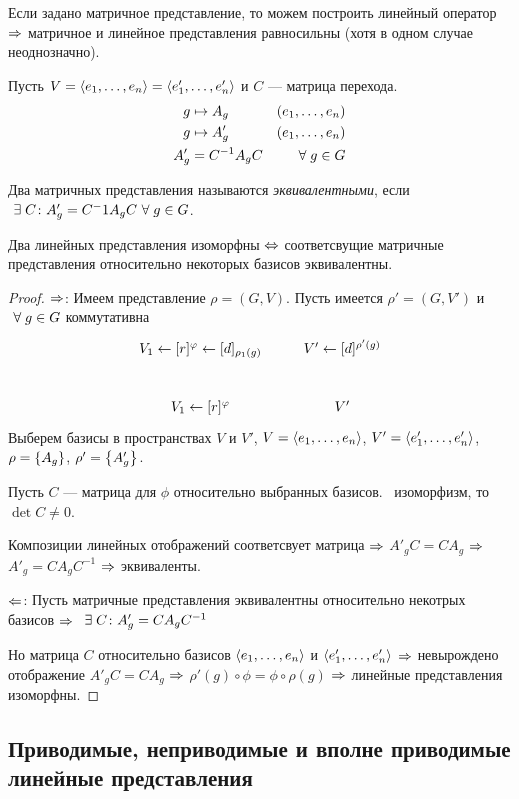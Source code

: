 Если задано матричное представление,
то можем построить линейный оператор $\Rightarrow$
матричное и линейное представления равносильны
(хотя в одном случае неоднозначно).

Пусть $V = \left\langle e_1 ,\ldots, e_n\right\rangle = \left\langle e'_1 ,\ldots, e'_n\right\rangle$ и $C$ --- матрица перехода.
\begin{align*}
	g &\mapsto A_g & \left(e_1 ,\ldots, e_n\right) \\
	g &\mapsto A'_g & \left(e_1 ,\ldots, e_n\right) \\
	A'_g & = C^{-1} A_g C & ~\forall\; g \in G
\end{align*}

\begin{df}
	Два матричных представления называются \textit{эквивалентными},
	если 
		$~\exists\; C \colon A'_g = C^-1 A_g C ~\forall\; g \in G$.
\end{df}

\begin{stm}
	Два линейных представления изоморфны $\Leftrightarrow$
	соответсвущие матричные представления относительно некоторых базисов эквивалентны.
\end{stm}
\begin{proof}
	$\Rightarrow$: Имеем представление $\rho = (G, V)$.
	Пусть имеется $\rho' = (G, V')$ и $~\forall\; g \in G$ коммутативна
	$$
		\xymatrix{
				V_1 \ar[r]^{\phi} \ar[d]_{\rho_1(g)} & V' \ar[d]^{\rho'(g)} \\
				V_1 \ar[r]^{\phi} & V'
			}
	$$
	Выберем базисы в пространствах $V$ и $V'$,
	$V = \left\langle e_1 ,\ldots, e_n\right\rangle$, $V' = \left\langle e'_1 ,\ldots, e'_n\right\rangle$, $\rho = \left\{A_g\right\}$, $\rho' = \left\{A'_g\right\}$.

	Пусть $C$ --- матрица для $\phi$ относительно выбранных базисов.
	\Bt\ изоморфизм, то $\det C \ne 0$.

	Композиции линейных отображений соответсвует матрица $\Rightarrow$
	$A'_g C = C A_g$ $\Rightarrow$ $A'_g = C A_g C^{-1}$ $\Rightarrow$ эквиваленты.

	$\Leftarrow$: Пусть матричные представления эквивалентны относительно некотрых базисов $\Rightarrow$
	$~\exists\; C \colon A'_g = C A_g C^{-1}$

	Но матрица $C$ относительно базисов $\left\langle e_1 ,\ldots, e_n\right\rangle$ и $\left\langle e'_1 ,\ldots, e'_n\right\rangle$ $\Rightarrow$
	невырождено отображение $A'_g C = C A_g$ $\Rightarrow$ $\rho'(g) \circ \phi = \phi \circ \rho(g)$ $\Rightarrow$
	линейные представления изоморфны.
\end{proof}


\subsection{Приводимые, неприводимые и вполне приводимые линейные представления}

